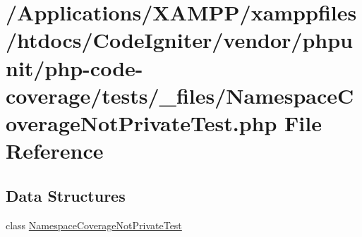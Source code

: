 \hypertarget{php-code-coverage_2tests_2__files_2_namespace_coverage_not_private_test_8php}{}\section{/\+Applications/\+X\+A\+M\+P\+P/xamppfiles/htdocs/\+Code\+Igniter/vendor/phpunit/php-\/code-\/coverage/tests/\+\_\+files/\+Namespace\+Coverage\+Not\+Private\+Test.php File Reference}
\label{php-code-coverage_2tests_2__files_2_namespace_coverage_not_private_test_8php}
\subsection*{Data Structures}
\begin{DoxyCompactItemize}
\item 
class \mbox{\hyperlink{class_namespace_coverage_not_private_test}{Namespace\+Coverage\+Not\+Private\+Test}}
\end{DoxyCompactItemize}
